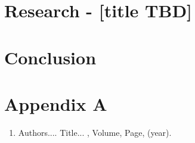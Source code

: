 \documentclass[synopsis,MS]             %
              {iitmdiss}
\begin{document}
\chapter{ Research - [title TBD]} 


\chapter{Conclusion}


\appendix

\chapter{Appendix A}



\begin{singlespace}
  
\end{singlespace}



\listofpapers

\begin{enumerate}  
\item Authors....  \newblock
 Title...
  , Volume,
  Page, (year).
\end{enumerate}  
\end{document}
